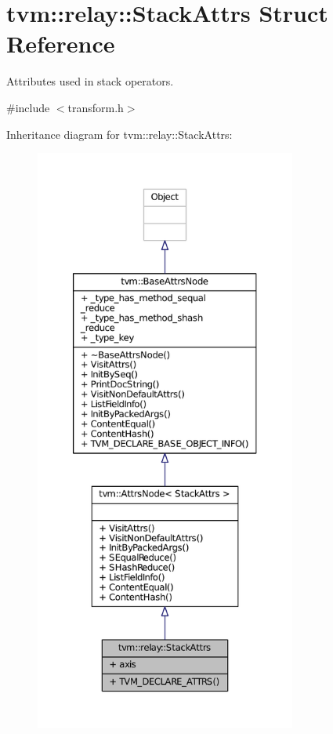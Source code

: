 \hypertarget{structtvm_1_1relay_1_1StackAttrs}{}\section{tvm\+:\+:relay\+:\+:Stack\+Attrs Struct Reference}
\label{structtvm_1_1relay_1_1StackAttrs}


Attributes used in stack operators.  




{\ttfamily \#include $<$transform.\+h$>$}



Inheritance diagram for tvm\+:\+:relay\+:\+:Stack\+Attrs\+:
\nopagebreak
\begin{figure}[H]
\begin{center}
\leavevmode
\includegraphics[height=550pt]{structtvm_1_1relay_1_1StackAttrs__inherit__graph}
\end{center}
\end{figure}


